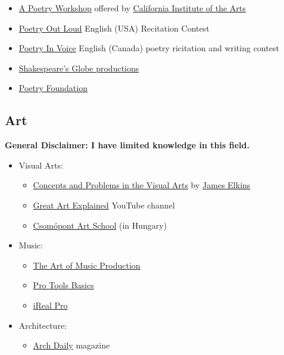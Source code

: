 \documentclass{article}
\begin{document}
\begin{itemize}
\begin{itemize}
        \item \href{https://www.coursera.org/learn/poetry-workshop}{A Poetry Workshop} offered by \href{https://calarts.edu/}{California Institute of the Arts}
        \item \href{https://www.poetryoutloud.org/}{Poetry Out Loud} English (USA) Recitation Contest
        \item \href{https://www.poetryinvoice.com/}{Poetry In Voice} English (Canada) poetry ricitation and writing contest
        \item \href{https://player.shakespearesglobe.com/}{Shakespeare’s Globe productions}
        \item \href{https://www.poetryfoundation.org/}{Poetry Foundation}
    \end{itemize}
\end{itemize}

\subsection{Art}
\textbf{General Disclaimer: I have limited knowledge in this field.}

\begin{itemize}
    \item Visual Arts:
    \begin{itemize}
        \item \href{https://www.youtube.com/playlist?list=PLJp6WIMKaI7zrpqYofh8CskCzxw90s2XB}{Concepts and Problems in the Visual Arts} by \href{https://en.wikipedia.org/wiki/James_Elkins_(art_historian)}{James Elkins}
        \item \href{https://www.youtube.com/@GreatArtExplained}{Great Art Explained} YouTube channel
        \item \href{https://csomopont.art/}{Csomópont Art School} (in Hungary)
    \end{itemize}
    \item Music:
    \begin{itemize}
        \item \href{https://www.coursera.org/learn/producing-music?specialization=diy-musician}{The Art of Music Production}
        \item \href{https://www.coursera.org/learn/protools?specialization=diy-musician}{Pro Tools Basics}
        \item \href{https://www.irealpro.com/}{iReal Pro}
    \end{itemize}
    \item Architecture:
    \begin{itemize}
        \item \href{https://www.archdaily.com/}{Arch Daily} magazine
    \end{itemize}
\end{itemize}
\end{document}
